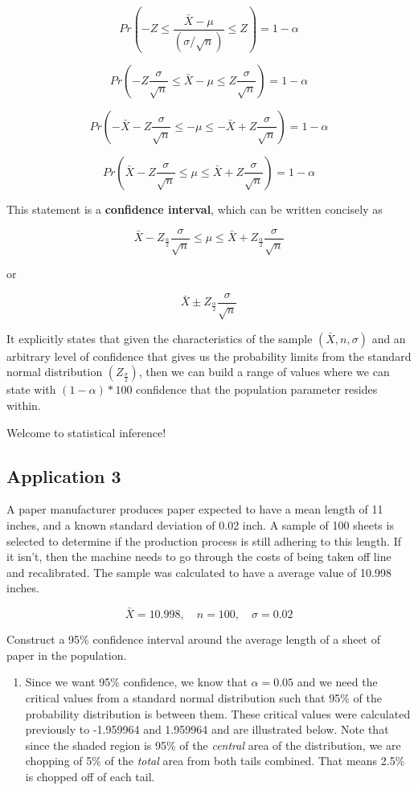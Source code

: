 \documentclass[
]{book}
\providecommand{\tightlist}{%
  \setlength{\itemsep}{0pt}\setlength{\parskip}{0pt}}
\begin{document}
\[Pr\left(-Z \leq \frac{\bar{X}-\mu}{(\sigma/\sqrt{n})} \leq Z\right)=1-\alpha\]

\[Pr\left(-Z\frac{\sigma}{\sqrt{n}} \leq \bar{X}-\mu \leq Z\frac{\sigma}{\sqrt{n}}\right)=1-\alpha\]

\[Pr\left(-\bar{X}-Z\frac{\sigma}{\sqrt{n}} \leq -\mu \leq -\bar{X}+Z\frac{\sigma}{\sqrt{n}}\right)=1-\alpha\]

\[Pr\left(\bar{X}-Z\frac{\sigma}{\sqrt{n}} \leq \mu \leq \bar{X}+Z\frac{\sigma}{\sqrt{n}}\right)=1-\alpha\]

This statement is a \textbf{confidence interval}, which can be written concisely as

\[\bar{X}-Z_{\frac{\alpha}{2}}\frac{\sigma}{\sqrt{n}} \leq \mu \leq \bar{X}+Z_{\frac{\alpha}{2}}\frac{\sigma}{\sqrt{n}}\]

or

\[\bar{X} \pm Z_{\frac{\alpha}{2}}\frac{\sigma}{\sqrt{n}}\]

It explicitly states that given the characteristics of the sample \((\bar{X},n,\sigma)\) and an arbitrary level of confidence that gives us the probability limits from the standard normal distribution \((Z_{\frac{\sigma}{2}})\), then we can build a range of values where we can state with \((1-\alpha)*100%
\) confidence that the population parameter resides within.

Welcome to statistical inference!

\hypertarget{application-3}{%
\subsection{Application 3}\label{application-3}}

A paper manufacturer produces paper expected to have a mean length of 11 inches, and a known standard deviation of 0.02 inch. A sample of 100 sheets is selected to determine if the production process is still adhering to this length. If it isn't, then the machine needs to go through the costs of being taken off line and recalibrated. The sample was calculated to have a average value of 10.998 inches.

\[\bar{X} = 10.998, \quad n = 100, \quad \sigma = 0.02\]

Construct a 95\% confidence interval around the average length of a sheet of paper in the population.

\begin{enumerate}
\def\labelenumi{\arabic{enumi}.}
\tightlist
\item
  Since we want 95\% confidence, we know that \(\alpha = 0.05\) and we need the critical values from a standard normal distribution such that 95\% of the probability distribution is between them. These critical values were calculated previously to -1.959964 and 1.959964 and are illustrated below. Note that since the shaded region is 95\% of the \emph{central} area of the distribution, we are chopping of 5\% of the \emph{total} area from both tails combined. That means 2.5\% is chopped off of each tail.
\end{enumerate}
\end{document}
